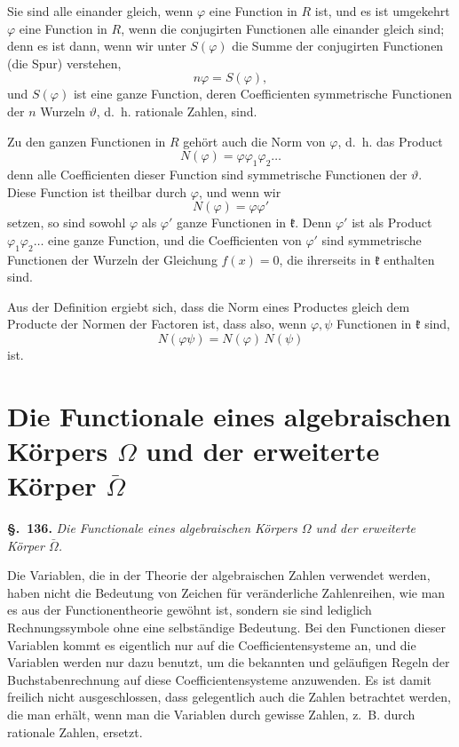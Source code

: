 \documentclass[12pt,a4paper]{article}
\theoremstyle{definition}
\begin{document}
Sie sind alle einander gleich, wenn $\varphi$ eine Function in $R$ ist, und es ist umgekehrt $\varphi$ eine Function in $R$, wenn die conjugirten Functionen alle einander gleich sind; denn es ist dann, wenn wir unter $S(\varphi)$ die Summe der conjugirten Functionen (die Spur) verstehen,
\[
n\varphi = S(\varphi),
\]
und $S(\varphi)$ ist eine ganze Function, deren Coefficienten symmetrische Functionen der $n$ Wurzeln $\vartheta$, d.~h. rationale Zahlen, sind.

Zu den ganzen Functionen in $R$ gehört auch die Norm von $\varphi$, d.~h. das Product
\begin{equation}\label{eq:135-6}
N(\varphi) = \varphi\varphi_1\varphi_2\dots
\end{equation}
denn alle Coefficienten dieser Function sind symmetrische Functionen der $\vartheta$. Diese Function ist theilbar durch $\varphi$, und wenn wir
\[
N(\varphi) = \varphi\varphi'
\]
setzen, so sind sowohl $\varphi$ als $\varphi'$ ganze Functionen in $\mathfrak{k}$. Denn $\varphi'$ ist als Product $\varphi_1\varphi_2\dots$ eine ganze Function, und die Coefficienten von $\varphi'$ sind symmetrische Functionen der Wurzeln der Gleichung $f(x)=0$, die ihrerseits in $\mathfrak{k}$ enthalten sind.

Aus der Definition ergiebt sich, dass die Norm eines Productes gleich dem Producte der Normen der Factoren ist, dass also, wenn $\varphi,\psi$ Functionen in $\mathfrak{k}$ sind,
\begin{equation}\label{eq:135-7}
N(\varphi\psi) = N(\varphi)\,N(\psi)
\end{equation}
ist.

\newpage
\section[Die Functionale eines algebraischen Körpers $\Omega$ und der erweiterte Körper $\bar{\Omega}$]%
        {Die Functionale eines algebraischen Körpers $\Omega$ und der erweiterte Körper $\bar{\Omega}$}\label{sec:136}

\noindent\textbf{\S.~136.}\quad
\textit{Die Functionale eines algebraischen Körpers $\Omega$ und der erweiterte Körper $\bar{\Omega}$.}\par\medskip

Die Variablen, die in der Theorie der algebraischen Zahlen verwendet werden, haben nicht die Bedeutung von Zeichen für veränderliche Zahlenreihen, wie man es aus der Functionentheorie gewöhnt ist, sondern sie sind lediglich Rechnungssymbole ohne eine selbständige Bedeutung. Bei den Functionen dieser Variablen kommt es eigentlich nur auf die Coefficientensysteme an, und die Variablen werden nur dazu benutzt, um die bekannten und geläufigen Regeln der Buchstabenrechnung auf diese Coefficientensysteme anzuwenden. Es ist damit freilich nicht ausgeschlossen, dass gelegentlich auch die Zahlen betrachtet werden, die man erhält, wenn man die Variablen durch gewisse Zahlen, z.~B. durch rationale Zahlen, ersetzt.
\end{document}
